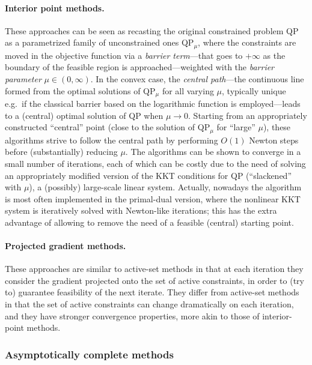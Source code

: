 \paragraph{Interior point methods.}
%
These approaches can be seen as recasting the original constrained problem QP as a parametrized family of unconstrained ones QP$_\mu$, where the constraints are moved in the objective function via a \emph{barrier term}---that goes to $+\infty$ as the boundary of the feasible region is approached---weighted with the \emph{barrier parameter} $\mu \in (0, \infty)$. In the convex case, the \emph{central path}---the continuous line formed from the optimal solutions of QP$_\mu$ for all varying $\mu$, typically unique e.g.~if the classical barrier based on the logarithmic function is employed---leads to a (central) optimal solution of QP when $\mu \to 0$. Starting from an appropriately constructed ``central'' point (close to the solution of QP$_\mu$ for ``large'' $\mu$), these algorithms strive to follow the central path by performing $O(1)$ Newton steps before (substantially) reducing $\mu$. The algorithms can be shown to converge in a small number of iterations, each of which can be costly due to the need of solving an appropriately modified version of the KKT conditions for QP (``slackened'' with $\mu$), a (possibly) large-scale linear system. Actually, nowadays the algorithm is most often implemented in the primal-dual version, where the nonlinear KKT system is iteratively solved with Newton-like iterations; this has the extra advantage of allowing to remove the need of a feasible (central) starting point.

\paragraph{Projected gradient methods.}
%
These approaches are similar to active-set methods in that at each iteration they consider the gradient projected onto the set of active constraints, in order to (try to) guarantee feasibility of the next iterate. They differ from active-set methods in that the set of active constraints can change dramatically on each iteration, and they have stronger convergence properties, more akin to those of interior-point methods.

\subsubsection{Asymptotically complete methods}\label{sss:asymc}

